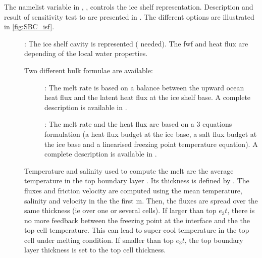 \documentclass[../main/NEMO_manual]{subfiles}
\begin{document}
\begin{listing}
  \caption{}
  \label{lst:namsbc_isf}
\end{listing}

The namelist variable in , , controls the ice shelf representation.
Description and result of sensitivity test to  are presented in \citet{mathiot.jenkins.ea_GMD17}.
The different options are illustrated in \autoref{fig:SBC_isf}.

\begin{description}
  \item [{}]: The ice shelf cavity is represented ( needed).
  The fwf and heat flux are depending of the local water properties.

  Two different bulk formulae are available:

  \begin{description}
  \item [{}]: The melt rate is based on a balance between the upward ocean heat flux and
    the latent heat flux at the ice shelf base. A complete description is available in \citet{hunter_rpt06}.
  \item [{}]: The melt rate and the heat flux are based on a 3 equations formulation
    (a heat flux budget at the ice base, a salt flux budget at the ice base and a linearised freezing point temperature equation).
    A complete description is available in \citet{jenkins_JGR91}.
  \end{description}

  Temperature and salinity used to compute the melt are the average temperature in the top boundary layer \citet{losch_JGR08}.
  Its thickness is defined by .
  The fluxes and friction velocity are computed using the mean temperature, salinity and velocity in the the first  m.
  Then, the fluxes are spread over the same thickness (ie over one or several cells).
  If  larger than top $e_{3}t$, there is no more feedback between the freezing point at the interface and the the top cell temperature.
  This can lead to super-cool temperature in the top cell under melting condition.
  If  smaller than top $e_{3}t$, the top boundary layer thickness is set to the top cell thickness.\\


\end{description}
\end{document}
